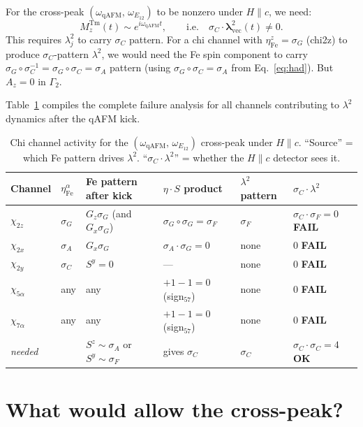 \documentclass[11pt,a4paper]{article}
\newcommand{\sF}{\sigma_F}
\newcommand{\sG}{\sigma_G}
\newcommand{\sA}{\sigma_A}
\newcommand{\sC}{\sigma_C}
\newcommand{\vlam}{\bm{\lambda}}
\newcommand{\etaz}{\eta^z}
\newcommand{\Mz}{M_z^{\mathrm{Tm}}}
\newcommand{\lamt}{\lambda^2}
\newcommand{\Gtwo}{\Gamma_2}
\newcommand{\qAFM}{\mathrm{qAFM}}
\newcommand{\EtA}{E_{12}}
\newcommand{\crossP}{(\omega_{\qAFM},\,\omega_{\EtA})}
\begin{document}
For the cross-peak $\crossP$ to be nonzero under $H\parallel c$, we need:
\begin{equation}
  \Mz(t) \sim e^{i\omega_{\qAFM} t}, \qquad \text{i.e.}\quad
  \sC \cdot \vlam^2_{\mathrm{vec}}(t) \neq 0.
\end{equation}
This requires $\lamt_j$ to carry $\sC$ pattern.  For a chi channel with
$\etaz_{\mathrm{Fe}} = \sG$ (chi2z) to produce $\sC$-pattern $\lamt$, we
would need the Fe spin component to carry $\sG\circ\sC^{-1} = \sG\circ\sC = \sA$
pattern (using $\sG\circ\sC = \sA$ from Eq.~\eqref{eq:had}).  But $A_z = 0$
in $\Gtwo$.

Table~\ref{tab:survey} compiles the complete failure analysis for all channels
contributing to $\lamt$ dynamics after the qAFM kick.

\begin{table}[h!]
\centering
\caption{Chi channel activity for the $\crossP$ cross-peak under $H\parallel c$.
  ``Source'' = which Fe pattern drives $\lamt$.  ``$\sC\cdot\lamt$'' = whether
  the $H\parallel c$ detector sees it.}
\label{tab:survey}
\begin{tabular}{llllll}
\toprule
Channel & $\eta^\alpha_{\mathrm{Fe}}$ & Fe pattern after kick & $\eta\cdot S$ product & $\lamt$ pattern & $\sC\cdot\lamt$ \\
\midrule
$\chi_{2z}$ & $\sG$ & $G_z\sG$ (and $G_x\sG$) & $\sG\circ\sG = \sF$ & $\sF$ & $\sC\cdot\sF=0$ \textcolor{failred}{\textbf{FAIL}} \\
$\chi_{2x}$ & $\sA$ & $G_x\sG$ & $\sA\cdot\sG = 0$ & none & $0$ \textcolor{failred}{\textbf{FAIL}} \\
$\chi_{2y}$ & $\sC$ & $S^y=0$ & --- & none & $0$ \textcolor{failred}{\textbf{FAIL}} \\
$\chi_{5\alpha}$ & any & any & $+1-1=0$ (sign$_{57}$) & none & $0$ \textcolor{failred}{\textbf{FAIL}} \\
$\chi_{7\alpha}$ & any & any & $+1-1=0$ (sign$_{57}$) & none & $0$ \textcolor{failred}{\textbf{FAIL}} \\
\midrule
\multicolumn{2}{l}{\textit{needed}} & $S^z\sim\sA$ or $S^y\sim\sF$ & gives $\sC$ & $\sC$ & $\sC\cdot\sC=4$ \textcolor{passgreen}{\textbf{OK}} \\
\bottomrule
\end{tabular}
\end{table}

\section{What would allow the cross-peak?}
\label{sec:remedy}
\end{document}
